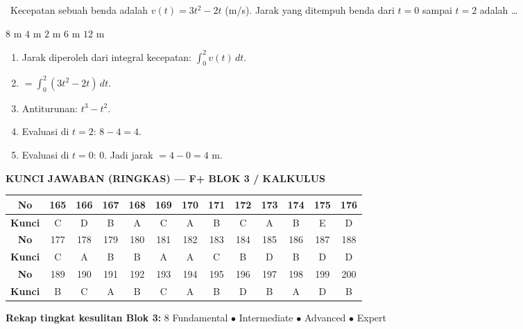 \documentclass[11pt,a4paper]{exam}
\newenvironment{langkah}{%
  \begin{enumerate}[label=\textbf{Langkah \arabic*:},leftmargin=2.6em,
    itemsep=2pt,topsep=2pt]}{\end{enumerate}}
\newcommand{\Exp}{{\footnotesize\textsf{\textcolor{ungu}{[Expert]}}}\ }
\begin{document}
\begin{questions}
\question \Exp Kecepatan sebuah benda adalah $v(t) = 3t^{2} - 2t$ (m/s). Jarak yang
ditempuh benda dari $t=0$ sampai $t=2$ adalah \dots
\begin{choices}
\choice $8$ m \CorrectChoice $4$ m \choice $2$ m \choice $6$ m \choice $12$ m
\end{choices}
\begin{solution}
\begin{langkah}
\item Jarak diperoleh dari integral kecepatan: $\displaystyle\int_{0}^{2} v(t)\,dt$.
\item $= \displaystyle\int_{0}^{2} (3t^{2} - 2t)\,dt$.
\item Antiturunan: $t^{3} - t^{2}$.
\item Evaluasi di $t=2$: $8 - 4 = 4$.
\item Evaluasi di $t=0$: $0$. Jadi jarak $= 4 - 0 = 4$ m.
\end{langkah}
\end{solution}

\end{questions}

\clearpage
{\large\bfseries\color{biru} KUNCI JAWABAN (RINGKAS) — F+ BLOK 3 / KALKULUS}\par
\vspace{8pt}
\renewcommand{\arraystretch}{1.3}
\begin{center}
\begin{tabular}{|c|*{12}{c|}}
\hline
\cellcolor{biru!15}\textbf{No} & 165 & 166 & 167 & 168 & 169 & 170 & 171 & 172 & 173 & 174 & 175 & 176\\\hline
\cellcolor{biru!15}\textbf{Kunci} & C & D & B & A & C & A & B & C & A & B & E & D\\\hline\hline
\cellcolor{biru!15}\textbf{No} & 177 & 178 & 179 & 180 & 181 & 182 & 183 & 184 & 185 & 186 & 187 & 188\\\hline
\cellcolor{biru!15}\textbf{Kunci} & C & A & B & B & A & A & C & B & D & B & D & D\\\hline\hline
\cellcolor{biru!15}\textbf{No} & 189 & 190 & 191 & 192 & 193 & 194 & 195 & 196 & 197 & 198 & 199 & 200\\\hline
\cellcolor{biru!15}\textbf{Kunci} & B & C & A & B & C & A & B & D & B & A & D & B\\\hline
\end{tabular}
\end{center}

\vspace{8pt}
\begin{center}\small
\textbf{Rekap tingkat kesulitan Blok 3:}
8 Fundamental \;$\bullet$ Intermediate \;$\bullet$ Advanced \;$\bullet$ Expert
\end{center}
\end{document}
